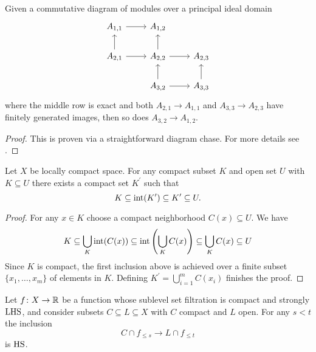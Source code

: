 \begin{lem} \label{l:commutative algebra}
	Given a commutative diagram of modules over a principal ideal domain
	\begin{equation*}
	\begin{tikzcd}
	A_{1,1} \arrow[r] & A_{1,2} & \\
	A_{2,1} \arrow[r] \arrow[u] & A_{2,2} \arrow[r] \arrow[u] & A_{2,3} \\
	& A_{3,2} \arrow[r] \arrow[u] & A_{3,3} \arrow[u]
	\end{tikzcd}
	\end{equation*}
	where the middle row is exact and both $A_{2,1} \to A_{1,1}$ and $A_{3,3} \to A_{2,3}$ have finitely generated images, then so does $A_{3,2} \to A_{1,2}$.
\end{lem}

\begin{proof}
	This is proven via a straightforward diagram chase.
For more details see \cite[Lemma II.17.3]{Bredon.1997}.
\end{proof}

\begin{lem} \label{l:neighborhood third}
	Let $X$ be locally compact space.
	For any compact subset $K$ and open set $U$ with $K \subseteq U$ there exists a compact set $K^\prime$ such that
	\begin{equation*}
	K \subseteq \operatorname{int}(K^\prime) \subseteq K^\prime \subseteq U.
	\end{equation*}
\end{lem}

\begin{proof}
	For any $x \in K$ choose a compact neighborhood $C(x) \subseteq U$.
	We have
	\begin{equation*}
	K \subseteq \bigcup_K \operatorname{int}(C(x)) \subseteq \operatorname{int}\left(\bigcup_K C(x)\right) \subseteq \bigcup_K C(x) \subseteq U
	\end{equation*}
	Since $K$ is compact, the first inclusion above is achieved over a finite subset $\{x_1, \dots, x_m\}$ of elements in $K$.
	Defining $K^\prime = \bigcup_{i=1}^m C(x_i)$ finishes the proof.
\end{proof}

\begin{lem} \label{l:key lemma for q-tameness}
    Let $f \colon X \to \mathbb{R}$ be a function whose sublevel set filtration is compact and strongly $\mathrm{LHS}$, and
	consider subsets $C \subseteq L \subseteq X$ with $C$ compact and $L$ open.
	For any $s < t$ the inclusion
	\begin{equation*}
	C \cap f_{\leq s} \to L \cap f_{\leq t}
	\end{equation*}
	is $\mathrm{HS}$.
\end{lem}

